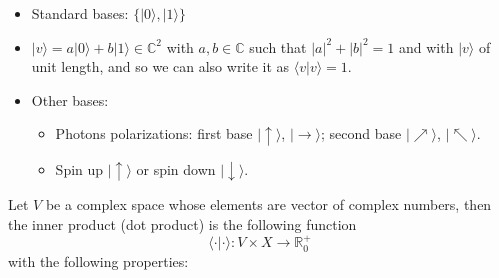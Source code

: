 \documentclass[12pt,a4paper]{report}
\begin{document}
\begin{itemize}
\item Standard bases: $ \lbrace |0\rangle, |1\rangle \rbrace $
\item $ |v\rangle = a|0\rangle + b|1\rangle \in \mathbb{C}^{2} $ with $a, b \in \mathbb{C} $ such that $ |a|^{2} + |b|^{2} = 1 $ and with $ |v\rangle $ of unit length, and so we can also write it as $ \langle v | v \rangle = 1 $.
\item Other bases:
\begin{itemize}
\item Photons polarizations: first base $ |\uparrow \rangle $, $ \vert \rightarrow \rangle $; second base $ |\nearrow \rangle $, $ \vert \nwarrow \rangle $.
\item Spin up $ |\uparrow\rangle $ or spin down $ |\downarrow\rangle $.
\end{itemize}
\end{itemize} 
Let $V$ be a complex space whose elements are vector of complex numbers, then the inner product (dot product) is the following function
$$ \langle \cdot | \cdot \rangle : V \times X \rightarrow \mathbb{R}^{+}_{0} $$
with the following properties:
\end{document}
